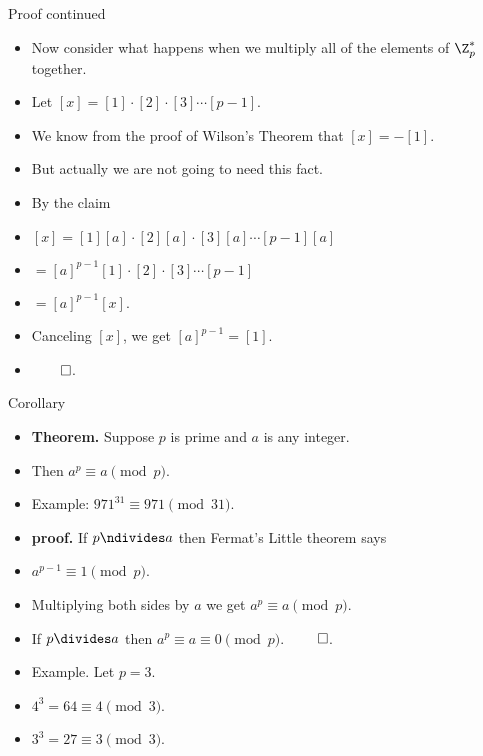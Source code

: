 \documentclass{beamer}
\begin{document}
\begin{frame}{Proof continued}

\begin{itemize}
  \item Now consider what happens when we multiply all of the elements of $\Z^*_p$ together.
  \item Let $[x] = [1]\cdot[2]\cdot[3]\cdots[p-1]$.
  \item We know from the proof of Wilson's Theorem that $[x] = -[1]$.
  \item But actually we are not going to need this fact.
  \item By the claim
  \item $[x] = [1][a]\cdot[2][a]\cdot[3][a]\cdots[p-1][a]$
  \item  $=[a]^{p-1}[1]\cdot[2]\cdot[3]\cdots[p-1]$
  \item $=[a]^{p-1}[x]$.
  \item Canceling $[x]$, we get $[a]^{p-1}=[1]$.
  \item $\qed$.
\end{itemize}

\end{frame}

\begin{frame}{Corollary}

\begin{itemize}
  \item \textbf{Theorem.} Suppose $p$ is prime and $a$ is any integer.
  \item Then $a^p \equiv a \pmod p$.
  \item Example: $971^{31} \equiv 971 \pmod{31}$.
  \item \textbf{proof.} If $p\ndivides a$ then Fermat's Little theorem says
  \item $a^{p-1} \equiv 1 \pmod p$.
  \item Multiplying both sides by $a$ we get $a^p \equiv a \pmod p$.
  \item If $p\divides a$ then $a^p \equiv a \equiv 0 \pmod p$. $\qed$.
  \item Example. Let $p=3$.
  \item $4^3 = 64 \equiv 4 \pmod 3$.
  \item $3^3 = 27 \equiv 3 \pmod 3$.
\end{itemize}

\end{frame}
\end{document}
